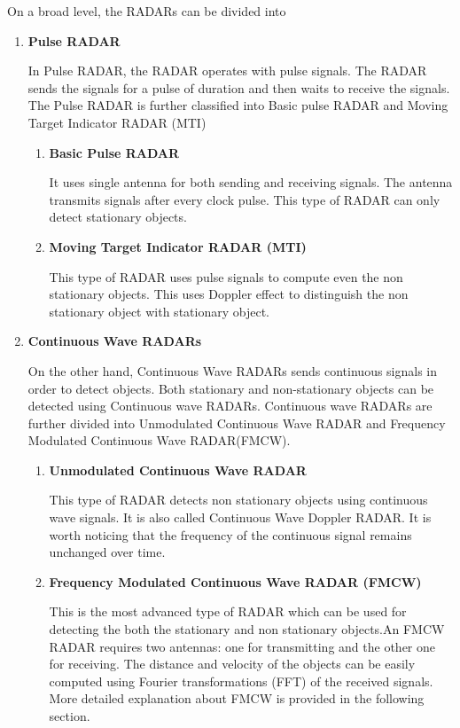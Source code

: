 On a broad level, the RADARs can be divided into \begin{enumerate}
    \item \textbf{Pulse RADAR}
    
    In Pulse RADAR, the RADAR operates with pulse signals. The RADAR sends the signals for a pulse of duration and then waits to receive the signals. The Pulse RADAR is further classified into Basic pulse RADAR and Moving Target Indicator RADAR (MTI)
    \begin{enumerate}
    \item \textbf{Basic Pulse RADAR}
    
    It uses single antenna for both sending and receiving signals.  The antenna transmits signals after every clock pulse. This type of RADAR can only detect stationary objects.
    
    \item \textbf{Moving Target Indicator RADAR (MTI)}
    
    This type of RADAR uses pulse signals to compute even the non stationary objects. This uses Doppler effect to distinguish the non stationary object with stationary object.  
    
\end{enumerate}
    \item \textbf{Continuous Wave RADARs}
    
    On the other hand,  Continuous Wave RADARs sends continuous signals in order to detect objects. Both stationary and non-stationary objects can be detected using Continuous wave RADARs. Continuous wave RADARs are further divided into Unmodulated Continuous Wave RADAR  and Frequency Modulated Continuous Wave RADAR(FMCW).
    \begin{enumerate}

    \item \textbf{Unmodulated Continuous Wave RADAR}
   
    This type of RADAR detects non stationary objects using continuous wave signals. It is also called Continuous Wave Doppler RADAR. It is worth noticing that the frequency of the continuous signal remains unchanged over time.
    
    \item \textbf{Frequency Modulated Continuous Wave RADAR (FMCW)}
    
    This is the most advanced type of RADAR which can be used for detecting the both the stationary and non stationary objects.An FMCW RADAR requires two antennas: one for transmitting and the other one for receiving. The distance and velocity of the objects can be easily computed using Fourier transformations (FFT) of the received signals. More detailed explanation about FMCW is provided in the following section. 
\end{enumerate}
\end{enumerate} 








